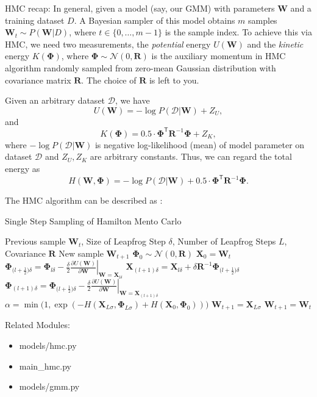 \documentclass{article}
\newcommand{\mR}{\bm{R}}
\newcommand{\mW}{\bm{W}}
\newcommand{\mX}{\bm{X}}
\newcommand{\mPhi}{\bm{\Phi}}
\begin{document}
HMC recap: In general, given a model (say, our GMM) with parameters  $\mW$ and a training dataset $D$.
A Bayesian sampler of this model obtains $m$ samples $\mW_{t} \sim P(\mW|D)$, where $t \in \{0,\ldots,m-1\}$ is the sample index.
To achieve this via HMC, we need two measurements, the {\em potential} energy $U(\mW)$
and the {\em kinetic} energy $K(\mPhi)$, where $\mPhi \sim \mathcal{N}(0, \mR)$ is the
auxiliary momentum in HMC algorithm randomly sampled from zero-mean Gaussian
distribution with covariance matrix $\mR$.
The choice of $\mR$ is left to you.

Given an arbitrary dataset $\mathcal{D}$, we have $$U(\mW) = -\log
P(\mathcal{D}|\mW) + Z_{U},$$ and $$K(\mPhi) = 0.5 \cdot \mPhi^\mathsf{T}
\mR^{-1} \mPhi + Z_{K},$$ where $-\log P(\mathcal{D}|\mW)$ is negative
log-likelihood (mean) of model parameter on dataset $\mathcal{D}$ and $Z_{U},
Z_{K}$ are arbitrary constants.
Thus, we can regard the total energy as $$H(\mW, \mPhi) = -\log
P(\mathcal{D}|\mW) + 0.5 \cdot \mPhi^\mathsf{T} \mR^{-1} \mPhi.$$

The HMC algorithm can be described as :
\begin{algorithm}
\caption{Single Step Sampling of Hamilton Mento Carlo}
\label{alg:hmc}
\begin{algorithmic}
\Require Previous sample $\mW_{t}$, Size of Leapfrog Step $\delta$, Number of
Leapfrog Steps $L$, Covariance $\mR$
\Ensure New sample $\mW_{t + 1}$
\State $\mPhi_{0} \sim \mathcal{N}(0, \mR)$
\State $\mX_{0} = \mW_{t}$
    \State $\mPhi_{\big( l + \frac{1}{2} \big) \delta} = \mPhi_{l \delta} -
    \frac{\delta}{2} \left. \frac{\partial U(\mW)}{\partial \mW}
    \right|_{\mW = \mX_{l \delta}}$
    \State $\mX_{(l + 1) \delta} = \mX_{l \delta} + \delta \mR^{-1}
    \mPhi_{\big( l + \frac{1}{2} \big) \delta}$
    \State $\mPhi_{(l + 1) \delta} = \mPhi_{\big( l +
    \frac{1}{2} \big) \delta} - \frac{\delta}{2} \left. \frac{\partial U(\mW)}
    {\partial \mW} \right|_{\mW = \mX_{(l + 1) \delta}}$
\EndFor
\State $\alpha = \min\big(1, \exp(-H(\mX_{L \sigma}, \mPhi_{L \sigma}) +
H(\mX_{0}, \mPhi_{0}))\big)$
    \State $\mW_{t + 1} = \mX_{L \sigma}$
\Else
    \State $\mW_{t + 1} = \mW_{t}$
\EndIf
\end{algorithmic}
\end{algorithm}

%
\hfill

%
\noindent Related Modules:
%
\begin{itemize}
%
\item
    models/hmc.py
\item
    main\_hmc.py
\item
    models/gmm.py
%
\end{itemize}
\end{document}
